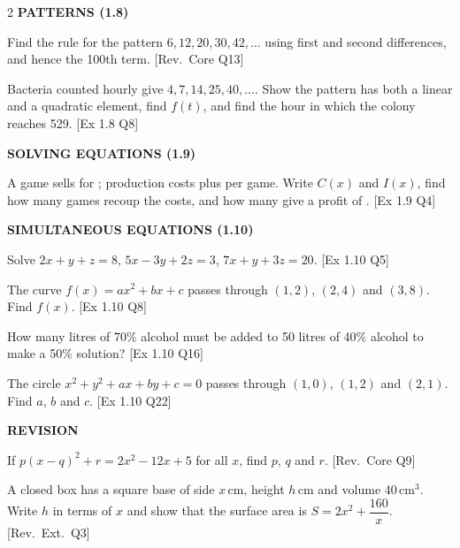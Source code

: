 \documentclass[11pt]{article}
\newcommand{\bk}[1]{{\footnotesize\color{greyish}[#1]}}
\begin{document}
\begin{multicols}{2}
{\color{lilacdeep}\footnotesize\bfseries PATTERNS (1.8)}
\begin{qlist}[resume]
\item Find the rule for the pattern $6,12,20,30,42,\dots$ using first and second differences, and hence the 100th term. \bk{Rev.\ Core Q13}
\item Bacteria counted hourly give $4,7,14,25,40,\dots$. Show the pattern has both a linear and a quadratic element, find $f(t)$, and find the hour in which the colony reaches 529. \bk{Ex 1.8 Q8}
\end{qlist}

{\color{lilacdeep}\footnotesize\bfseries SOLVING EQUATIONS (1.9)}
\begin{qlist}[resume]
\item A game sells for ; production costs  plus  per game. Write $C(x)$ and $I(x)$, find how many games recoup the costs, and how many give a profit of . \bk{Ex 1.9 Q4}
\end{qlist}

{\color{lilacdeep}\footnotesize\bfseries SIMULTANEOUS EQUATIONS (1.10)}
\begin{qlist}[resume]
\item Solve $2x+y+z=8$, $5x-3y+2z=3$, $7x+y+3z=20$. \bk{Ex 1.10 Q5}
\item The curve $f(x)=ax^{2}+bx+c$ passes through $(1,2)$, $(2,4)$ and $(3,8)$. Find $f(x)$. \bk{Ex 1.10 Q8}
\item How many litres of 70\% alcohol must be added to 50 litres of 40\% alcohol to make a 50\% solution? \bk{Ex 1.10 Q16}
\item The circle $x^{2}+y^{2}+ax+by+c=0$ passes through $(1,0)$, $(1,2)$ and $(2,1)$. Find $a$, $b$ and $c$. \bk{Ex 1.10 Q22}
\end{qlist}

{\color{lilacdeep}\footnotesize\bfseries REVISION}
\begin{qlist}[resume]
\item If $p(x-q)^{2}+r=2x^{2}-12x+5$ for all $x$, find $p$, $q$ and $r$. \bk{Rev.\ Core Q9}
\item A closed box has a square base of side $x$\,cm, height $h$\,cm and volume 40\,cm$^{3}$. Write $h$ in terms of $x$ and show that the surface area is $S=2x^{2}+\dfrac{160}{x}$. \bk{Rev.\ Ext.\ Q3}
\end{qlist}
\end{multicols}

\clearpage
\end{document}
